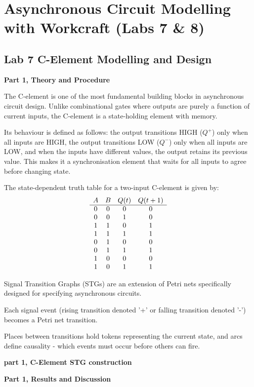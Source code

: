 \documentclass[a4paper,12pt]{article}
\begin{document}
\section{Asynchronous Circuit Modelling with Workcraft \- (Labs 7 \& 8)}

\subsection{Lab 7 \- C-Element Modelling and Design}

\textbf{Part 1, Theory and Procedure}

The C-element is one of the most fundamental building blocks in asynchronous circuit design. Unlike combinational gates where outputs are purely a function of current inputs, the C-element is a state-holding element with memory. 

Its behaviour is defined as follows: the output transitions HIGH ($Q^+$) only when all inputs are HIGH, the output transitions LOW ($Q^-$) only when all inputs are LOW, and when the inputs have different values, the output retains its previous value. This makes it a synchronisation element that waits for all inputs to agree before changing state.

The state-dependent truth table for a two-input C-element is given by:
\[
\begin{array}{c c c c}
A & B & Q(t) & Q(t+1) \\
\hline
0 & 0 & 0 & 0 \\
0 & 0 & 1 & 0 \\
1 & 1 & 0 & 1 \\
1 & 1 & 1 & 1 \\
0 & 1 & 0 & 0 \\
0 & 1 & 1 & 1 \\
1 & 0 & 0 & 0 \\
1 & 0 & 1 & 1
\end{array}
\]

Signal Transition Graphs (STGs) are an extension of Petri nets specifically designed for specifying asynchronous circuits. 

Each signal event (rising transition denoted '+' or falling transition denoted '-') becomes a Petri net transition. 

Places between transitions hold tokens representing the current state, and arcs define causality - which events must occur before others can fire.

\textbf{part 1, C-Element STG construction}

\textbf{Part 1, Results and Discussion}
\end{document}
